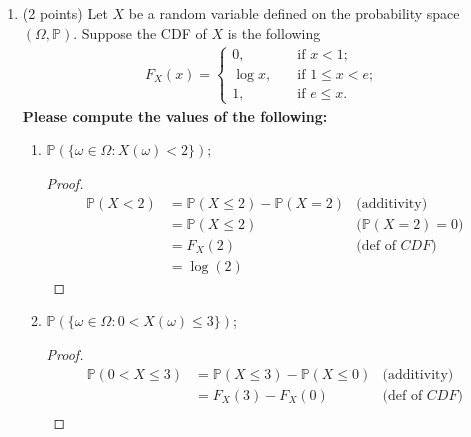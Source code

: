 \documentclass[11pt]{article}
\newcommand{\p}{\mathbb{P}}
\begin{document}
\begin{enumerate}
\begin{proof}
    We have that \(\p(X=0)=1=\p(\Omega)\implies \{\omega\in\Omega\ |\ X(\omega)=0\}=\Omega\). Thus,
    \begin{itemize}
        \item When \(x<0\), we have that \(F_X(x)=\p(X\leq x)=\p(\emptyset)=0\).
        \item When \(x\geq 0\), we have that \(F_X(x)=\p(X\leq x)=\p(\Omega)=1\).
    \end{itemize}
    Therefore, \(F_X(x)=
    \begin{cases}
        0 & \text{if } x<0,\\
        1 & \text{if } x\geq 1.
    \end{cases}\)
\end{proof}

\item (2 points) Let $X$ be a random variable defined on the probability space $(\Omega,\mathbb{P})$. Suppose the CDF of $X$ is the following
\begin{align*}
    F_X(x)=\left\{
    \begin{aligned}
    0,\ \ \ &\text{ if }x<1;\\
    \log x,\ \ \ &\text{ if }1\le x<e;\\
    1,\ \ \ &\text{ if }e\le x.
    \end{aligned}
    \right.
\end{align*}
\textbf{Please compute the values of the following:}
\begin{enumerate}
    \item $\mathbb{P}(\{\omega\in\Omega: X(\omega)<2\})$;
    \begin{proof}
        \begin{align*}
            \p(X<2)&=\p(X\leq 2) - \p(X=2) & \text{(additivity)}\\
            &= \p(X\leq 2) & \text{(\(\p(X=2)=0\))}\\
            &= F_X(2) & \text{(def of \(CDF\))}\\
            &= \log(2)
        \end{align*}
    \end{proof}
    \item $\mathbb{P}(\{\omega\in\Omega: 0<X(\omega)\le3\})$;
    \begin{proof}
        \begin{align*}
            \p(0<X\leq 3) &= \p(X\leq 3) - \p(X\leq 0) & \text{(additivity)}\\
            &= F_X(3) - F_X(0) & \text{(def of \(CDF\))}\\

\end{align*}
\end{proof}
\end{enumerate}
\end{enumerate}
\end{document}
